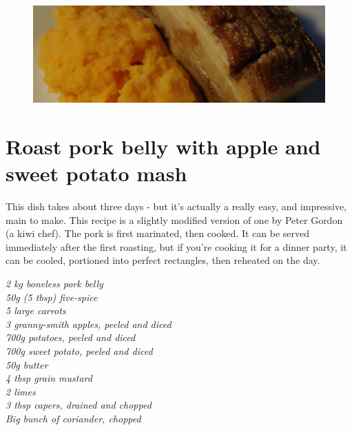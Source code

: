 \documentclass{tufte-book}
\begin{document}
\begin{figure}[h]
  \includegraphics[width=\linewidth]{bellyporkwide.png}
\end{figure}

\section{Roast pork belly with apple and sweet potato mash}

This dish takes about three days - but it's actually a really easy, and impressive, main to make. This recipe is a slightly modified version of one by Peter Gordon (a kiwi chef). The pork is first marinated, then cooked. It can be served immediately after the first roasting, but if you're cooking it for a dinner party, it can be cooled, portioned into perfect rectangles, then reheated on the day.

\smallskip
\emph{2 kg boneless pork belly
\\50g (5 tbsp) five-spice
\\5 large carrots
\\3 granny-smith apples, peeled and diced
\\700g potatoes, peeled and diced
\\700g sweet potato, peeled and diced
\\50g butter
\\4 tbsp grain mustard
\\2 limes
\\3 tbsp capers, drained and chopped
\\Big bunch of coriander, chopped
}
\end{document}
